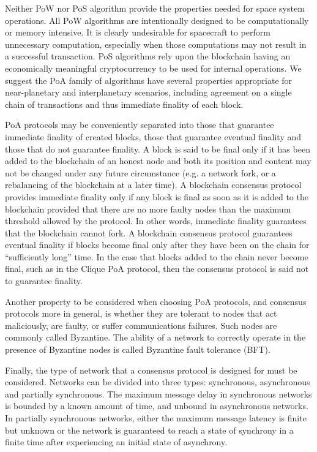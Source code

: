 \documentclass[]{aiaa-tc}%
\begin{document}
Neither PoW nor PoS algorithm provide the properties needed for space system operations. All PoW algorithms are intentionally designed to be computationally or memory intensive. It is clearly undesirable for spacecraft to perform unnecessary computation, especially when those computations may not result in a successful transaction. PoS algorithms rely upon the blockchain having an economically meaningful cryptocurrency to be used for internal operations. We suggest the PoA family of algorithms have several properties appropriate for near-planetary and interplanetary scenarios, including agreement on a single chain of transactions and thus immediate finality of each block.

PoA protocols may be conveniently separated into those that guarantee immediate finality of created blocks, those that guarantee eventual finality and those that do not guarantee finality. A block is said to be final only if it has been added to the blockchain of an honest node and both its position and content may not be changed under any future circumstance (e.g. a network fork, or a rebalancing of the blockchain at a later time). A blockchain consensus protocol provides immediate finality only if any block is final as soon as it is added to the blockchain provided that there are no more faulty nodes than the maximum threshold allowed by the protocol. In other words, immediate finality guarantees that the blockchain cannot fork. A blockchain consensus protocol guarantees eventual finality if blocks become final only after they have been on the chain for ``sufficiently long'' time. In the case that blocks added to the chain never become final, such as in the Clique PoA protocol\cite{Szilagyi-Clique}, then the consensus protocol is said not to guarantee finality.

Another property to be considered when choosing PoA protocols, and consensus protocols more in general, is whether they are tolerant to nodes that 
 act maliciously, 
are faulty, or suffer communications failures. 
 Such nodes are commonly called Byzantine\cite{lamport1982byzantine}. The ability of a network to correctly operate in the presence of Byzantine nodes is called Byzantine fault tolerance (BFT).

Finally, the type of network that a consensus protocol is designed for must be considered. Networks can be divided into three types: synchronous, asynchronous and partially synchronous\cite{dwork1988consensus}. The maximum message delay in synchronous networks is bounded by a known amount of time, and unbound in asynchronous networks. In partially synchronous networks, either the maximum message latency is finite but unknown or the network is guaranteed to reach a state of synchrony in a finite time after experiencing an initial state of asynchrony.
\end{document}
